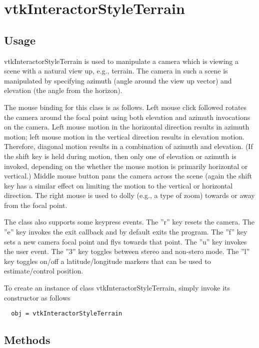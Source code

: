 \section{vtkInteractorStyleTerrain}

\subsection{Usage}

 vtkInteractorStyleTerrain is used to manipulate a camera which is viewing
 a scene with a natural view up, e.g., terrain. The camera in such a
 scene is manipulated by specifying azimuth (angle around the view
 up vector) and elevation (the angle from the horizon).

 The mouse binding for this class is as follows. Left mouse click followed
 rotates the camera around the focal point using both elevation and azimuth
 invocations on the camera. Left mouse motion in the horizontal direction
 results in azimuth motion; left mouse motion in the vertical direction
 results in elevation motion. Therefore, diagonal motion results in a
 combination of azimuth and elevation. (If the shift key is held during
 motion, then only one of elevation or azimuth is invoked, depending on the
 whether the mouse motion is primarily horizontal or vertical.) Middle
 mouse button pans the camera across the scene (again the shift key has a
 similar effect on limiting the motion to the vertical or horizontal
 direction. The right mouse is used to dolly (e.g., a type of zoom) towards
 or away from the focal point.

 The class also supports some keypress events. The ''r'' key resets the
 camera.  The ''e'' key invokes the exit callback and by default exits the
 program. The ''f'' key sets a new camera focal point and flys towards that
 point. The ''u'' key invokes the user event. The ''3'' key toggles between 
 stereo and non-stero mode. The ''l'' key toggles on/off a latitude/longitude
 markers that can be used to estimate/control position.
 

To create an instance of class vtkInteractorStyleTerrain, simply
invoke its constructor as follows
\begin{verbatim}
  obj = vtkInteractorStyleTerrain
\end{verbatim}
\subsection{Methods}


